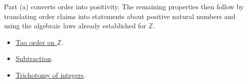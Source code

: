 \begin{remark*}[Interpretation]
Part (a) converts order into positivity. The remaining properties then follow
by translating order claims into statements about positive natural numbers and
using the algebraic laws already established for \(\mathbb{Z}\).
\end{remark*}

\begin{dependencies}
\begin{itemize}
  \item \hyperref[def:tao-order-on-z]{Tao order on \(\mathbb{Z}\)}.
  \item \hyperref[def:int-subtraction]{Subtraction}.
  \item \hyperref[lem:int-trichotomy]{Trichotomy of integers}.
\end{itemize}
\end{dependencies}

